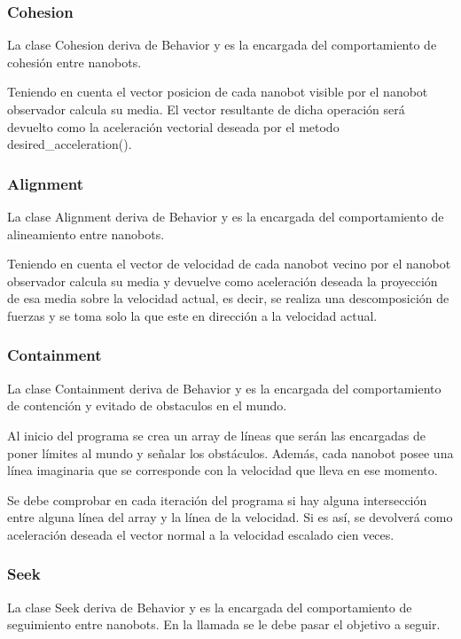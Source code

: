 \subsubsection{Cohesion}
\label{sec:cohesion}
La clase Cohesion deriva de Behavior y es la encargada del comportamiento de cohesión entre nanobots.

Teniendo en cuenta el vector posicion de cada nanobot visible por el nanobot observador calcula su media. El vector resultante de dicha operación será devuelto como la aceleración vectorial deseada por el metodo desired\_acceleration().

\subsubsection{Alignment}
\label{sec:alignment}
La clase Alignment deriva de Behavior y es la encargada del comportamiento de alineamiento entre nanobots.

Teniendo en cuenta el vector de velocidad de cada nanobot vecino por el nanobot observador calcula su media y devuelve como aceleración deseada la proyección de esa media sobre la velocidad actual, es decir, se realiza una descomposición de fuerzas y se toma solo la que este en dirección a la velocidad actual.

\subsubsection{Containment}
\label{sec:containment}
La clase Containment deriva de Behavior y es la encargada del comportamiento de contención y evitado de obstaculos en el mundo.

Al inicio del programa se crea un array de líneas que serán las encargadas de poner límites al mundo y señalar los obstáculos. Además, cada nanobot posee una línea imaginaria que se corresponde con la velocidad que lleva en ese momento.

Se debe comprobar en cada iteración del programa si hay alguna intersección entre alguna línea del array y la línea de la velocidad. Si es así, se devolverá como aceleración deseada el vector normal a la velocidad escalado cien veces.

\subsubsection{Seek}
\label{sec:seek}
La clase Seek deriva de Behavior y es la encargada del comportamiento de seguimiento entre nanobots. En la llamada se le debe pasar el objetivo a seguir. 

